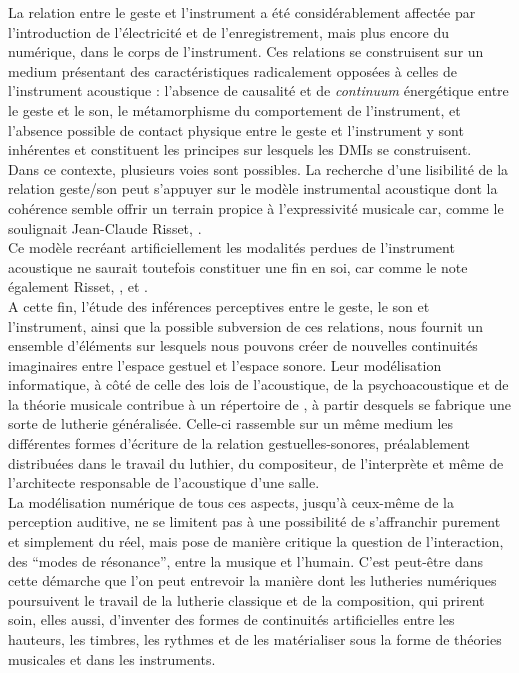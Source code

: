 \noindent La relation entre le geste et l'instrument a été considérablement affectée par l'introduction de l'électricité et de l'enregistrement, mais plus encore du numérique, dans le corps de l'instrument. Ces relations se construisent sur un medium présentant des caractéristiques radicalement opposées à celles de l'instrument acoustique : l'absence de causalité et de \textit{continuum} énergétique entre le geste et le son, le métamorphisme du comportement de l'instrument, et l'absence possible de contact physique entre le geste et l'instrument y sont inhérentes et constituent les principes sur lesquels les \glspl{DMI} se construisent.\\
\indent Dans ce contexte, plusieurs voies sont possibles. La recherche d'une lisibilité de la relation geste/son peut s'appuyer sur le modèle instrumental acoustique dont la cohérence semble offrir un terrain propice à l'expressivité musicale car, comme le soulignait Jean-Claude Risset,  \cite{risset_son_1992}.\\
\indent Ce modèle recréant artificiellement les modalités perdues de l'instrument acoustique ne saurait toutefois constituer une fin en soi, car comme le note également Risset,  \cite{risset_propos_2010}, et  \cite{risset_son_1992}.\\
\indent A cette fin, l'étude des inférences perceptives entre le geste, le son et l'instrument, ainsi que la possible subversion de ces relations, nous fournit un ensemble d'éléments sur lesquels nous pouvons créer de nouvelles continuités imaginaires entre l'espace gestuel et l'espace sonore. Leur modélisation informatique, à côté de celle des lois de l'acoustique, de la psychoacoustique et de la théorie musicale contribue à un répertoire de , à partir desquels se fabrique une sorte de lutherie généralisée. Celle-ci rassemble sur un même medium les différentes formes d'écriture de la relation gestuelles-sonores, préalablement distribuées dans le travail du luthier, du compositeur, de l'interprète et même de l'architecte responsable de l'acoustique d'une salle.\\
\indent La modélisation numérique de tous ces aspects, jusqu'à ceux-même de la perception auditive, ne se limitent pas à une possibilité de s'affranchir purement et simplement du réel, mais pose de manière critique la question de l'interaction, des ``modes de résonance'', entre la musique et l'humain. C'est peut-être dans cette démarche que l'on peut entrevoir la manière dont les lutheries numériques poursuivent le travail de la lutherie classique et de la composition, qui prirent soin, elles aussi, d'inventer des formes de continuités artificielles entre les hauteurs, les timbres, les rythmes et de les matérialiser sous la forme de théories musicales et dans les instruments.

